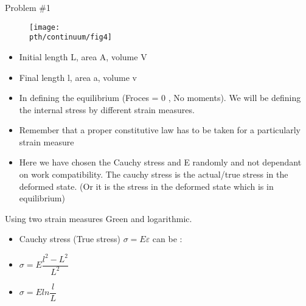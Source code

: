 	\begin{frame}{Problem \#1}
	\begin{figure}
		\centering
		\texttt{[image: \\pth/continuum/fig4]}
		\caption{}
		\label{fig:fig1}
	\end{figure}
	\begin{itemize}
		\item Initial length L, area A, volume V
		\item  Final length l, area a, volume v
		
	\end{itemize}
	\end{frame}

	\begin{frame}
		\begin{itemize}
			\item In defining the equilibrium (Froces = 0 , No moments). We will be defining the internal stress by different strain measures.
			\item Remember that a proper constitutive law has to be taken for a particularly strain measure
			\item Here we have chosen the Cauchy stress and E randomly and not dependant on work compatibility. The cauchy stress is the actual/true stress in the deformed state. (Or it is the stress in the deformed state which is in equilibrium)
			
		\end{itemize}
		\begin{block}{Using two strain measures}
			Green and logarithmic.
			\begin{itemize}
				\item Cauchy stress (True stress) $\sigma = E \varepsilon$ can be :
				\item $\sigma = E \dfrac{l^2-L^2}{L^2}$
				\item $\sigma = E ln\dfrac{l}{L}$
			\end{itemize}
		\end{block}
	\end{frame}

